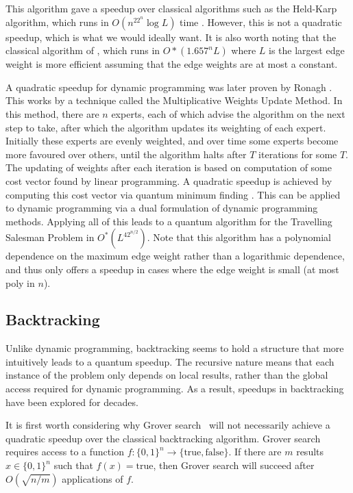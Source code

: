 This algorithm gave a speedup over classical algorithms such as the Held-Karp algorithm, which runs in $O(n^22^n\log L)$ time \cite{held1962}. However, this is not a quadratic speedup, which is what we would ideally want. It is also worth noting that the classical algorithm of \cite{bjorklund14}, which runs in $O*(1.657^nL)$ where $L$ is the largest edge weight is more efficient assuming that the edge weights are at most a constant.

A quadratic speedup for dynamic programming was later proven by Ronagh \cite{ronagh2019}. This works by a technique called the Multiplicative Weights Update Method. In this method, there are $n$ experts, each of which advise the algorithm on the next step to take, after which the algorithm updates its weighting of each expert. Initially these experts are evenly weighted, and over time some experts become more favoured over others, until the algorithm halts after $T$ iterations for some $T$. The updating of weights after each iteration is based on computation of some cost vector found by linear programming. A quadratic speedup is achieved by computing this cost vector via quantum minimum finding \cite{durr1996}. This can be applied to dynamic programming via a dual formulation of dynamic programming methods. Applying all of this leads to a quantum algorithm for the Travelling Salesman Problem in $O^*(L^42^{n/2})$. Note that this algorithm has a polynomial dependence on the maximum edge weight rather than a logarithmic dependence, and thus only offers a speedup in cases where the edge weight is small (at most poly in $n$).

\subsection{Backtracking}
\label{sec:q-backtrack}

Unlike dynamic programming, backtracking seems to hold a structure that more intuitively leads to a quantum speedup. The recursive nature means that each instance of the problem only depends on local results, rather than the global access required for dynamic programming. As a result, speedups in backtracking have been explored for decades.

It is first worth considering why Grover search~\cite{grover96} will not necessarily achieve a quadratic speedup over the classical backtracking algorithm. Grover search requires access to a function $f \colon \{0,1\}^n \rightarrow \{\text{true}, \text{false}\}$. If there are $m$ results $x \in \{0,1\}^n$ such that $f(x) = \text{true}$, then Grover search will succeed after $O(\sqrt{n/m})$ applications of $f$\cite{grover96}.


